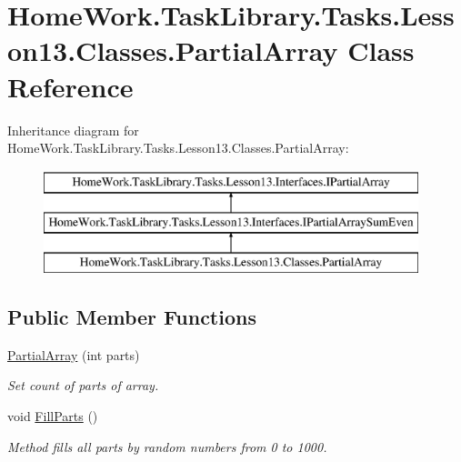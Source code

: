 \hypertarget{class_home_work_1_1_task_library_1_1_tasks_1_1_lesson13_1_1_classes_1_1_partial_array}{}\section{Home\+Work.\+Task\+Library.\+Tasks.\+Lesson13.\+Classes.\+Partial\+Array Class Reference}
\label{class_home_work_1_1_task_library_1_1_tasks_1_1_lesson13_1_1_classes_1_1_partial_array}
Inheritance diagram for Home\+Work.\+Task\+Library.\+Tasks.\+Lesson13.\+Classes.\+Partial\+Array\+:\begin{figure}[H]
\begin{center}
\leavevmode
\includegraphics[height=3.000000cm]{class_home_work_1_1_task_library_1_1_tasks_1_1_lesson13_1_1_classes_1_1_partial_array}
\end{center}
\end{figure}
\subsection*{Public Member Functions}
\begin{DoxyCompactItemize}
\item 
\mbox{\hyperlink{class_home_work_1_1_task_library_1_1_tasks_1_1_lesson13_1_1_classes_1_1_partial_array_aef3476393c739dd83b981019aab0e24f}{Partial\+Array}} (int parts)
\begin{DoxyCompactList}\small\item\em Set count of parts of array. \end{DoxyCompactList}\item 
void \mbox{\hyperlink{class_home_work_1_1_task_library_1_1_tasks_1_1_lesson13_1_1_classes_1_1_partial_array_a87d2c4381a229c73895d4ea5540d1854}{Fill\+Parts}} ()
\begin{DoxyCompactList}\small\item\em Method fills all parts by random numbers from 0 to 1000. \end{DoxyCompactList}\end{DoxyCompactItemize}
